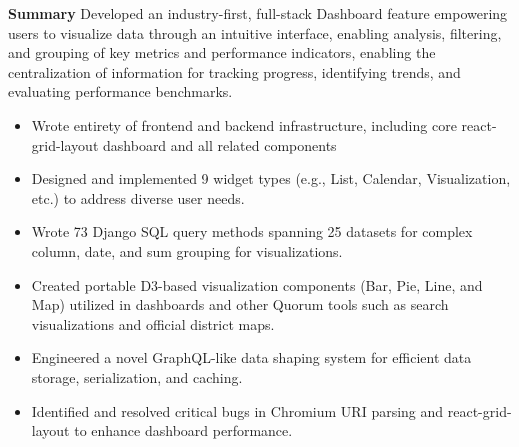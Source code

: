 \documentclass[]{article}
\begin{document}
\textbf{Summary}
Developed an industry-first, full-stack Dashboard feature empowering users to visualize data through an intuitive interface, enabling analysis, filtering, and grouping of key metrics and performance indicators, enabling the centralization of information for tracking progress, identifying trends, and evaluating performance benchmarks.

\begin{itemize}
	\item Wrote entirety of frontend and backend infrastructure, including core react-grid-layout dashboard and all related components
	\item Designed and implemented 9 widget types (e.g., List, Calendar, Visualization, etc.) to address diverse user needs.
	\item Wrote 73 Django SQL query methods spanning 25 datasets for complex column, date, and sum grouping for visualizations.
	\item Created portable D3-based visualization components (Bar, Pie, Line, and Map) utilized in dashboards and other Quorum tools such as search visualizations and official district maps.
	\item Engineered a novel GraphQL-like data shaping system for efficient data storage, serialization, and caching.
	\item Identified and resolved critical bugs in Chromium URI parsing and react-grid-layout to enhance dashboard performance.\\
\end{itemize}



\end{document}
